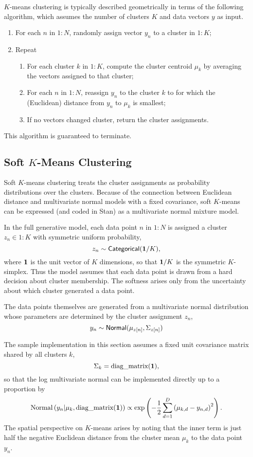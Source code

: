 $K$-means clustering is typically described geometrically in terms of
the following algorithm, which assumes the number of clusters $K$ and
data vectors $y$ as input.
%
\begin{enumerate}
\item For each $n$ in $1:N$, randomly assign vector $y_n$ to a cluster in $1{:}K$;
\item Repeat
\begin{enumerate} 
\item For each cluster $k$ in $1{:}K$, compute the cluster centroid $\mu_k$  by averaging the
  vectors assigned to that cluster;
\item For each $n$ in $1:N$, reassign $y_n$ to the cluster $k$ to
  for which the (Euclidean) distance from $y_n$ to $\mu_k$ is smallest;
\item If no vectors changed cluster, return the cluster assignments.
\end{enumerate}
\end{enumerate}
%
This algorithm is guaranteed to terminate.

\subsection{Soft $K$-Means Clustering}

Soft $K$-means clustering treats the cluster assignments as
probability distributions over the clusters.  Because of the
connection between Euclidean distance and multivariate normal models
with a fixed covariance, soft $K$-means can be expressed (and coded in
Stan) as a multivariate normal mixture model.

In the full generative model, each data point $n$ in $1{:}N$ is assigned
a cluster $z_n \in 1{:}K$ with symmetric uniform probability,
%
\[
z_n \sim \mbox{\sf Categorical}({\bf 1}/K),
\]
where ${\bf 1}$ is the unit vector of $K$ dimensions, so that ${\bf
  1}/K$ is the symmetric $K$-simplex.  Thus the model assumes that
each data point is drawn from a hard decision about cluster
membership.  The softness arises only from the uncertainty about which
cluster generated a data point.

The data points themselves are generated from a multivariate normal
distribution whose parameters are determined by the cluster assignment
$z_n$,
\[
y_n \sim  \mbox{\sf Normal}(\mu_{z[n]},\Sigma_{z[n]})
\]

The sample implementation in this section assumes a fixed unit
covariance matrix shared by all clusters $k$,
\[
\Sigma_k = \mbox{diag\_matrix}({\bf 1}),
\]
so that the log multivariate normal can be implemented directly up to a proportion
by
\[
\mbox{Normal}\left( y_n | \mu_k, \mbox{diag\_matrix}({\bf 1}) \right)
\propto \exp \left (- \frac{1}{2} \sum_{d=1}^D \left( \mu_{k,d} - y_{n,d}
  \right)^2 \right).
\]
The spatial perspective on $K$-means arises by noting that the inner
term is just half the negative Euclidean distance from the cluster
mean $\mu_k$ to the data point $y_n$.


